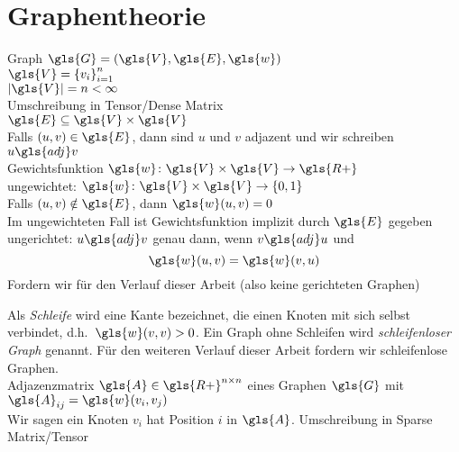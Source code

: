 \section{Graphentheorie}

Graph $\gls{G} = \left(\gls{V}, \gls{E}, \gls{w}\right)$\\
$\gls{V} = {\left\{ v_i \right\}}^n_{i=1}$\\
$\left| \gls{V} \right| = n < \infty$\\
Umschreibung in Tensor/Dense Matrix\\
$\gls{E} \subseteq \gls{V} \times \gls{V}$\\
Falls $\left( u, v \right) \in \gls{E}$, dann sind $u$ und $v$ adjazent und wir schreiben $u \gls{adj} v$\\
Gewichtsfunktion $\gls{w} \colon \gls{V} \times \gls{V} \to \gls{R+}$\\
ungewichtet: $\gls{w} \colon \gls{V} \times \gls{V} \to \left\{ 0, 1 \right\}$\\
Falls $\left( u, v \right) \notin \gls{E}$, dann $\gls{w}\left(u, v\right) = 0$\\
Im ungewichteten Fall ist Gewichtsfunktion implizit durch $\gls{E}$ gegeben\\

ungerichtet:
$u \gls{adj} v$ genau dann, wenn $v \gls{adj} u$ und
\begin{equation}
  \gls{w}\left(u, v\right) = \gls{w}\left(v, u\right)
\end{equation}
Fordern wir für den Verlauf dieser Arbeit (also keine gerichteten Graphen)

Als \emph{Schleife} wird eine Kante bezeichnet, die einen Knoten mit sich selbst verbindet, d.h.\ $\gls{w}\left(v, v\right) > 0$.
Ein Graph ohne Schleifen wird \emph{schleifenloser Graph} genannt.
Für den weiteren Verlauf dieser Arbeit fordern wir schleifenlose Graphen.\\

Adjazenzmatrix $\gls{A} \in \gls{R+}^{n \times n}$ eines Graphen $\gls{G}$ mit $\gls{A}_{ij} = \gls{w}\left(v_i, v_j\right)$\\
Wir sagen ein Knoten $v_i$ hat Position $i$ in $\gls{A}$.
Umschreibung in Sparse Matrix/Tensor\\

